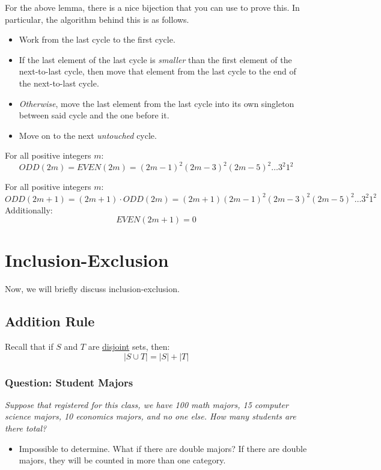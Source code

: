 \documentclass[letterpaper]{article}
\begin{document}
For the above lemma, there is a nice bijection that you can use to prove this. In particular, the algorithm behind this is as follows.
\begin{itemize}
    \item Work from the last cycle to the first cycle. 
    \item If the last element of the last cycle is \emph{smaller} than the first element of the next-to-last cycle, then move that element from the last cycle to the end of the next-to-last cycle. 
    \item \emph{Otherwise}, move the last element from the last cycle into its own singleton between said cycle and the one before it. 
    \item Move on to the next \emph{untouched} cycle. 
\end{itemize}

\begin{theorem}{}{}
    For all positive integers $m$:
    \[ODD(2m) = EVEN(2m) = (2m - 1)^2  (2m - 3)^2 (2m - 5)^2 \dots 3^2 1^2\]
\end{theorem}

\begin{theorem}{}{}
    For all positive integers $m$:
    \[ODD(2m + 1) = (2m + 1) \cdot ODD(2m) = (2m + 1) (2m - 1)^2 (2m - 3)^2 (2m - 5)^2 \dots 3^2 1^2\]
    Additionally:
    \[EVEN(2m + 1) = 0\]
\end{theorem}








\newpage 
\section{Inclusion-Exclusion}
Now, we will briefly discuss inclusion-exclusion.

\subsection{Addition Rule}
Recall that if $S$ and $T$ are \underline{disjoint} sets, then:
\[|S \cup T| = |S| + |T|\]

\subsubsection{Question: Student Majors}
\emph{Suppose that registered for this class, we have 100 math majors, 15 computer science majors, 10 economics majors, and no one else. How many students are there total?}
\begin{itemize}
    \item Impossible to determine. What if there are double majors? If there are double majors, they will be counted in more than one category. 
\end{itemize}
\end{document}
